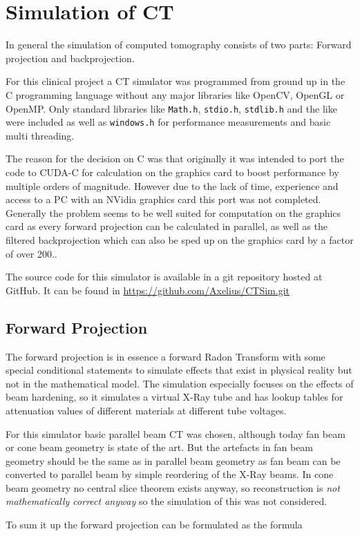 \chapter{Simulation of CT}
\par In general the simulation of computed tomography consists of two parts: Forward projection and backprojection.
\par For this clinical project a CT simulator was programmed from ground up in the C programming language without any major libraries like OpenCV, OpenGL or OpenMP. Only standard libraries like \verb!Math.h!, \verb!stdio.h!, \verb!stdlib.h! and the like were included as well as \verb!windows.h! for performance measurements and basic multi threading.
\par The reason for the decision on C was that originally it was intended to port the code to CUDA-C for calculation on the graphics card to boost performance by multiple orders of magnitude. However due to the lack of time, experience and access to a PC with an NVidia graphics card this port was not completed. Generally the problem seems to be well suited for computation on the graphics card as every forward projection can be calculated in parallel, as well as the filtered backprojection which can also be sped up on the graphics card by a factor of over 200.\cite{CUDABackprojection}.
\par The source code for this simulator is available in a git repository hosted at GitHub. It can be found in \url{https://github.com/Axelius/CTSim.git}
\section{Forward Projection}
\par The forward projection is in essence a forward Radon Transform with some special conditional statements to simulate effects that exist in physical reality but not in the mathematical model. The simulation especially focuses on the effects of beam hardening, so it simulates a virtual X-Ray tube and has lookup tables for attenuation values of different materials at different tube voltages.
\par For this simulator basic parallel beam CT was chosen, although today fan beam or cone beam geometry is state of the art. But the artefacts in fan beam geometry should be the same as in parallel beam geometry as fan beam can be converted to parallel beam by simple reordering of the X-Ray beams.\cite{IIIP_3_4} In cone beam geometry no central slice theorem exists anyway, so reconstruction is \emph{not mathematically correct anyway} so the simulation of this was not considered\cite{IIIP_3_5}.
\par To sum it up the forward projection can be formulated as the formula   \cite{deMan}

